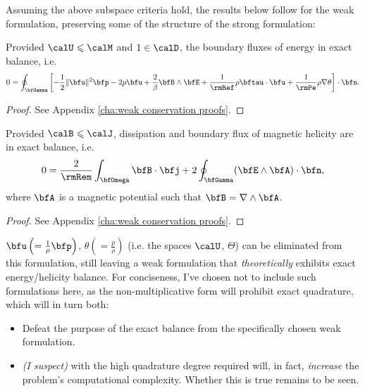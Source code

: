     Assuming the above subspace criteria hold, the results below follow for the weak formulation, preserving some of the structure of the strong formulation:
    
    \begin{theorem}
        Provided $\calU  \leqslant  \calM$ and $1  \in  \calD$, the boundary fluxes of energy in exact balance, i.e.
        \begin{equation}
            0  =  \oint_{\bfGamma}\left[- \frac{1}{2}\|\bfu\|^{2}\bfp - 2p\bfu + \frac{2}{\beta}\bfB\wedge\bfE + \frac{1}{\rmRef}\rho\bftau\cdot\bfu + \frac{1}{\rmPe}\rho\nabla\theta\right]\cdot\bfn.
        \end{equation}
    \end{theorem}
    \begin{proof}
        See Appendix \ref{cha:weak conservation proofs}.
    \end{proof}
    
    \begin{theorem}
        Provided $\calB  \leqslant  \calJ$, dissipation and boundary flux of magnetic helicity are in exact balance, i.e.
        \begin{equation}
            0  =  \frac{2}{\rmRem}\int_{\bfOmega}\bfB\cdot\bfj + 2\oint_{\bfGamma}(\bfE\wedge\bfA)\cdot\bfn,
        \end{equation}
        where $\bfA$ is a magnetic potential such that $\bfB  =  \nabla\wedge\bfA$.
    \end{theorem}
    \begin{proof}
        See Appendix \ref{cha:weak conservation proofs}.
    \end{proof}

    \begin{remark}
        $\bfu  \left(=  \frac{1}{\rho}\bfp\right)$, $\theta  \left(=  \frac{p}{\rho}\right)$ (i.e. the spaces $\calU$, $\Theta$) can be eliminated from this formulation, still leaving a weak formulation that \emph{theoretically} exhibits exact energy/helicity balance. For conciseness, I've chosen not to include such formulations here, as the non-multiplicative form will prohibit exact quadrature, which will in turn both:
        \begin{itemize}
            \item  Defeat the purpose of the exact balance from the specifically chosen weak formulation.
            \item  \emph{(I suspect)} with the high quadrature degree required will, in fact, \emph{increase} the problem's computational complexity. Whether this is true remains to be seen. 
        \end{itemize}
    \end{remark}
    